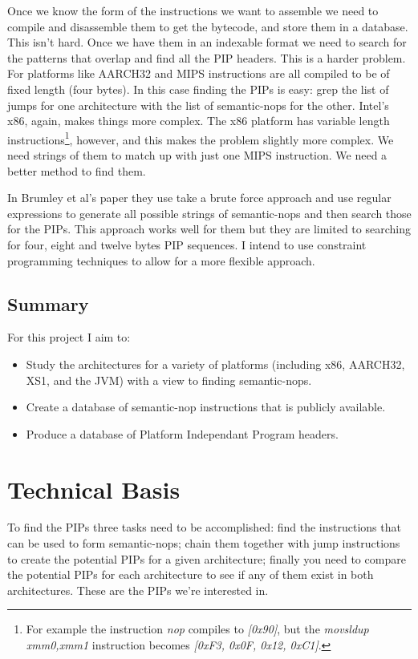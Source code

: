 \documentclass[]{book}
\begin{document}
Once we know the form of the instructions we want to assemble we need to
compile and disassemble them to get the bytecode, and store them in a
database. This isn't hard. Once we have them in an indexable format we
need to search for the patterns that overlap and find all the PIP
headers. This is a harder problem. For platforms like
AARCH32\autocite{Seal:2000vd} and
MIPS\autocite{MIPSTechnologiesInc:2011ta} instructions are all compiled
to be of fixed length (four bytes). In this case finding the PIPs is
easy: grep the list of jumps for one architecture with the list of
semantic-nops for the other. Intel's
x86\autocite{IntelCorporation:1997ta}, again, makes things more complex.
The x86 platform has variable length instructions\footnote{For example
  the instruction \emph{nop} compiles to \emph{{[}0x90{]}}, but the
  \emph{movsldup xmm0,xmm1} instruction becomes \emph{{[}0xF3, 0x0F,
  0x12, 0xC1{]}}.}, however, and this makes the problem slightly more
complex. We need strings of them to match up with just one MIPS
instruction. We need a better method to find them.

In Brumley et al's paper they use take a brute force approach and use
regular expressions to generate all possible strings of semantic-nops
and then search those for the PIPs. This approach works well for them
but they are limited to searching for four, eight and twelve bytes PIP
sequences. I intend to use constraint programming techniques to allow
for a more flexible approach.

\section{Summary}

For this project I aim to:

\begin{itemize}
\item
  Study the architectures for a variety of platforms (including x86,
  AARCH32, XS1, and the JVM) with a view to finding semantic-nops.
\item
  Create a database of semantic-nop instructions that is publicly
  available.
\item
  Produce a database of Platform Independant Program headers.
\end{itemize}
\chapter{Technical Basis}

To find the PIPs three tasks need to be accomplished: find the
instructions that can be used to form semantic-nops; chain them together
with jump instructions to create the potential PIPs for a given
architecture; finally you need to compare the potential PIPs for each
architecture to see if any of them exist in both architectures. These
are the PIPs we're interested in.
\end{document}
